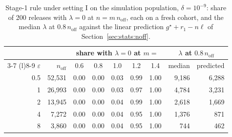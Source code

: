 \documentclass[11pt]{article}
\theoremstyle{definition}
\theoremstyle{plain}
\begin{document}
\begin{table}[t]
  \centering
  \small
  \caption{Stage-1 rule under setting I on the simulation population, $\delta = 10^{-9}$: share of 200 releases with $\lambda = 0$ at $n = m\, n_{\mathrm{off}}$, each on a fresh cohort, and the median $\lambda$ at $0.8\,n_{\mathrm{off}}$ against the linear prediction $g^\star + r_1 - n\ell$ of Section~\ref{sec:stats:noff}.}
  \label{tab:noff_check_v31}
  \begin{tabular}{@{}rrcccccrr@{}}
    \toprule
    & & \multicolumn{5}{c}{share with $\lambda = 0$ at $m =$} & \multicolumn{2}{c}{$\lambda$ at $0.8\,n_{\mathrm{off}}$} \\
    \cmidrule(lr){3-7} \cmidrule(l){8-9}
    $\varepsilon$ & $n_{\mathrm{off}}$ & 0.6 & 0.8 & 1.0 & 1.2 & 1.4 & median & predicted \\
    \midrule
    0.5 & 52{,}531 & 0.00 & 0.00 & 0.03 & 0.99 & 1.00 & 9{,}186 & 6{,}288 \\
    1 & 26{,}993 & 0.00 & 0.00 & 0.03 & 0.97 & 1.00 & 4{,}784 & 3{,}231 \\
    2 & 13{,}945 & 0.00 & 0.00 & 0.04 & 0.99 & 1.00 & 2{,}618 & 1{,}669 \\
    4 & 7{,}272 & 0.00 & 0.00 & 0.04 & 0.95 & 1.00 & 1{,}376 & 871 \\
    8 & 3{,}860 & 0.00 & 0.00 & 0.04 & 0.95 & 1.00 & 744 & 462 \\
    \bottomrule
  \end{tabular}
\end{table}
\end{document}
